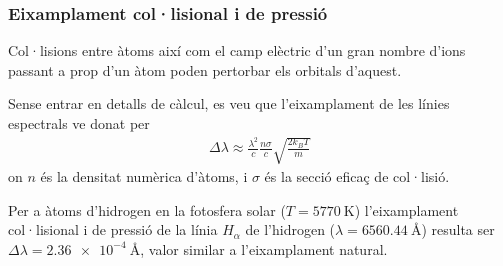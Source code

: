 \subsubsection*{Eixamplament col·lisional i de pressió}
Col·lisions entre àtoms així com el camp elèctric d'un gran nombre d'ions passant a prop d'un àtom poden pertorbar els orbitals d'aquest.

Sense entrar en detalls de càlcul, es veu que l'eixamplament de les línies espectrals ve donat per
\begin{align}
	\Delta \lambda \approx \frac{\lambda^{2}}{c} \frac{n \sigma}{c} \sqrt{\frac{2 k_{B} T}{m}}
\end{align}
on $n$ és la densitat numèrica d'àtoms, i $\sigma$ és la secció eficaç de col·lisió.
\begin{example}
	Per a àtoms d'hidrogen en la fotosfera solar ($T = \SI{5770}{\K}$) l'eixamplament col·lisional i de pressió de la línia $H_{\alpha}$ de l'hidrogen ($\lambda = \SI{6560.44}{\angstrom}$) resulta ser $\Delta \lambda = \SI{2.36 e-4}{\angstrom}$, valor similar a l'eixamplament natural.
\end{example}
